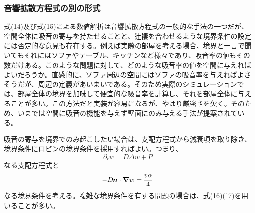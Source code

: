 \documentclass[dvipdfmx, 9pt, a4paper]{jsarticle}
\newcommand{\bm}[1]{{\mbox{\boldmath $#1$}}}
\begin{document}
\subsubsection{音響拡散方程式の別の形式}
式(14)及び式(15)による数値解析は音響拡散方程式の一般的な手法の一つだが、空間全体に吸音の寄与を持たせることと、辻褄を合わせるような境界条件の設定には否定的な意見も存在する。例えば実際の部屋を考える場合、境界と一言で聞いてもそれにはソファやテーブル、キッチンなど様々であり、吸音率の値もその数だけある。このような問題に対して、どのような吸音率の値を空間に与えればよいだろうか。直感的に、ソファ周辺の空間にはソファの吸音率を与えればよさそうだが、周辺の定義があいまいである。そのため実際のシミュレーションでは、部屋全体の境界を加味して便宜的な吸音率を計算し、それを部屋全体に与えることが多い。この方法だと実装が容易になるが、やはり厳密さを欠く。そのため、いまでは空間に吸音の機能を与えず壁面にのみ与える手法が提案されている。\par
吸音の寄与を境界でのみ起こしたい場合は、支配方程式から減衰項を取り除き、境界条件にロビンの境界条件を採用すればよい。つまり、
\begin{equation}
\partial_tw=D\Delta w+P
\end{equation}
なる支配方程式と
\begin{equation}
-D\bm n \cdot \bm \nabla w =\frac{v\alpha}{4}
\end{equation}
なる境界条件を考える。複雑な境界条件を有する問題の場合は、式(16)(17)を用いることが多い。
\end{document}
